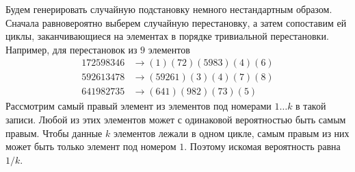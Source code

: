 \documentclass{article}
\begin{document}
Будем генерировать случайную подстановку немного нестандартным образом. Сначала равновероятно выберем случайную перестановку, а затем 
сопоставим ей циклы, заканчивающиеся на элементах в порядке тривиальной перестановки. Например, для перестановок из $9$ элементов
\begin{align*}
172598346 &\to (1)(72)(5983)(4)(6)\\
592613478 &\to (59261)(3)(4)(7)(8)\\
641982735 &\to (641)(982)(73)(5)
\end{align*}
Рассмотрим самый правый элемент из элементов под номерами $1\ldots k$ в такой записи. Любой из этих элементов может с одинаковой 
вероятностью быть самым правым. Чтобы данные $k$ элементов лежали в одном цикле, самым правым из них может быть только элемент 
под номером $1$. Поэтому искомая вероятность равна $1/k$. 
\end{document}
